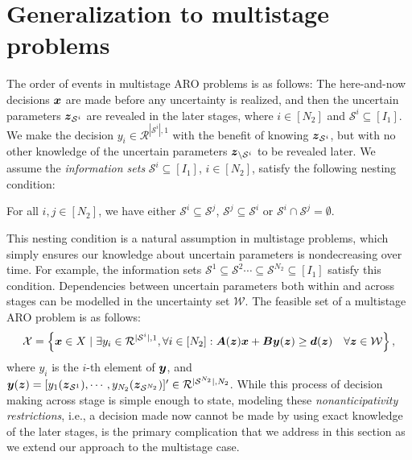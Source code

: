 \documentclass[fleqn,isre,blindrev]{informs4}
\newcommand{\mb}[1]{\mbox{\boldmath \ensuremath{#1}}}
\begin{document}
\section{Generalization to multistage problems} \label{sec:multi}	
	The order of events in multistage ARO problems is as follows: The here-and-now decisions $\mb{x}$ are made before any uncertainty is realized, and then the uncertain parameters $\mb{z}_{\mathcal{S}^i}$ are revealed in the later stages, where $i\in [N_2]$ and $\mathcal{S}^i\subseteq [I_1]$. We make the decision $y_i \in \mathcal{R}^{|\mathcal{S}^i|,1}$ with the benefit of knowing $\mb{z}_{\mathcal{S}^i}$, but with no other knowledge of the uncertain parameters $\mb{z}_{\setminus \mathcal{S}^i}$ to be revealed later. We assume the {\em information sets} $\mathcal{S}^i\subseteq [I_1]$, $i\in [N_2]$, satisfy the following nesting condition: 
	\begin{definition}
		For all $i,j \in [N_2]$, we have either $\mathcal{S}^i \subseteq \mathcal{S}^j$, $\mathcal{S}^j \subseteq \mathcal{S}^i$ or $\mathcal{S}^i \cap \mathcal{S}^j = \emptyset$.
	\end{definition}
	This nesting condition is a natural assumption in multistage problems, which simply ensures our knowledge about uncertain parameters is nondecreasing over time. For example, the information sets $\mathcal{S}^1 \subseteq \mathcal{S}^2 \cdots \subseteq \mathcal{S}^{N_2}\subseteq [I_1]$ satisfy this condition.	Dependencies between uncertain parameters both within and across stages can be modelled in the uncertainty set $\mathcal{W}$. The feasible set of a multistage ARO problem is as follows:
\begin{equation} \label{set:Xm}
	\mathcal{X} = \left\{ \mb{x} \in X \hspace{3pt} | \hspace{3pt}  \exists y_i \in \mathcal{R}^{|\mathcal{S}^i|,1}, \forall i\in [N_2]: \mb{A}(\mb{z})\mb{x}+\mb{B}\mb{y}(\mb{z}) \geq\mb{d}(\mb{z})  \quad  \forall \mb{z} \in \mathcal{W} \right\},
\end{equation}
	where $y_i$ is the $i$-th element of $\mb{y}$, and $\mb{y}(\mb{z}) = [y_1(\mb{z}_{\mathcal{S}^1}), \cdots, y_{N_2} (\mb{z}_{\mathcal{S}^{N_2}})]' \in \mathcal{R}^{|\mathcal{S}^{N_2}|,N_2}$. While this process of decision making across stage is simple enough to state, modeling these \textit{nonanticipativity restrictions}, i.e., a decision made now cannot be made by using exact knowledge of the later stages, is the primary complication that we address in this section as we extend our approach to the multistage case. 
	
\end{document}
